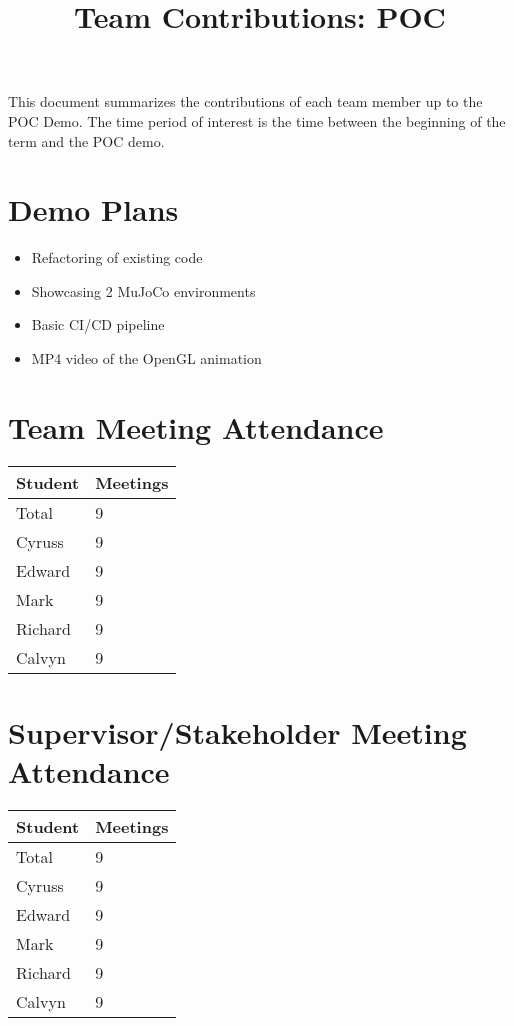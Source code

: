 \documentclass{article}
\title{Team Contributions: POC\\\progname}
\author{\authname}
\date{}
\begin{document}
\maketitle

This document summarizes the contributions of each team member up to the POC
Demo. The time period of interest is the time between the beginning of the term
and the POC demo.

\section{Demo Plans}

\begin{itemize}
    \item Refactoring of existing code 
    \item Showcasing 2 MuJoCo environments
    \item Basic CI/CD pipeline
    \item MP4 video of the OpenGL animation
\end{itemize}

\section{Team Meeting Attendance}

\begin{table}[H]
\centering
\begin{tabular}{ll}
\toprule
\textbf{Student} & \textbf{Meetings}\\
\midrule
Total & 9\\
Cyruss & 9\\
Edward & 9\\
Mark & 9\\
Richard & 9\\
Calvyn & 9\\
\bottomrule
\end{tabular}
\end{table}

\section{Supervisor/Stakeholder Meeting Attendance}

\begin{table}[H]
    \centering
    \begin{tabular}{ll}
    \toprule
    \textbf{Student} & \textbf{Meetings}\\
    \midrule
    Total & 9\\
    Cyruss & 9\\
    Edward & 9\\
    Mark & 9\\
    Richard & 9\\
    Calvyn & 9\\
    \bottomrule
    \end{tabular}
    \end{table}
\end{document}
